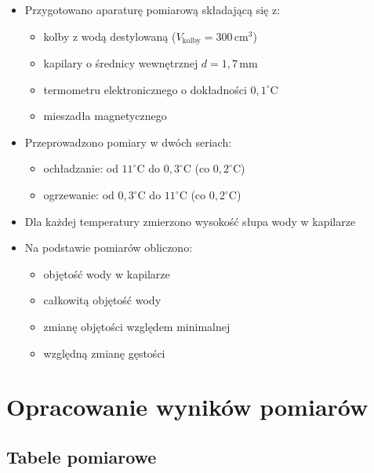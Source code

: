 \documentclass[a4paper,12pt]{article}
\begin{document}
\begin{itemize}
    \item Przygotowano aparaturę pomiarową składającą się z:
          \begin{itemize}
              \item kolby z wodą destylowaną ($V_{\text{kolby}} = 300\,\text{cm}^3$)
              \item kapilary o średnicy wewnętrznej $d = 1{,}7\,\text{mm}$
              \item termometru elektronicznego o dokładności $0{,}1^\circ$C
              \item mieszadła magnetycznego
          \end{itemize}

    \item Przeprowadzono pomiary w dwóch seriach:
          \begin{itemize}
              \item ochładzanie: od $11^\circ$C do $0{,}3^\circ$C (co $0{,}2^\circ$C)
              \item ogrzewanie: od $0{,}3^\circ$C do $11^\circ$C (co $0{,}2^\circ$C)
          \end{itemize}

    \item Dla każdej temperatury zmierzono wysokość słupa wody w kapilarze

    \item Na podstawie pomiarów obliczono:
          \begin{itemize}
              \item objętość wody w kapilarze
              \item całkowitą objętość wody
              \item zmianę objętości względem minimalnej
              \item względną zmianę gęstości
          \end{itemize}
\end{itemize}

\section{Opracowanie wyników pomiarów}

\subsection{Tabele pomiarowe}
\end{document}
